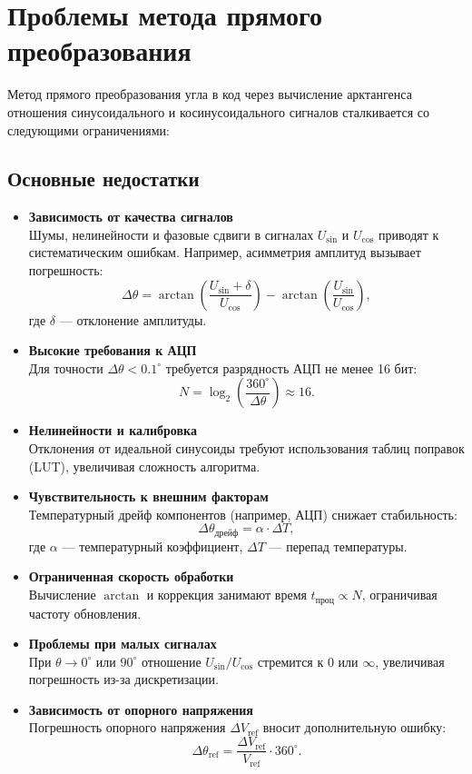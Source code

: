 \section{Проблемы метода прямого преобразования}
Метод прямого преобразования угла в код через вычисление арктангенса отношения синусоидального и косинусоидального сигналов сталкивается со следующими ограничениями:

\subsection{Основные недостатки}
\begin{itemize}
    \item \textbf{Зависимость от качества сигналов} \\
    Шумы, нелинейности и фазовые сдвиги в сигналах \( U_{\sin} \) и \( U_{\cos} \) приводят к систематическим ошибкам. Например, асимметрия амплитуд вызывает погрешность:
    \[
    \Delta\theta = \arctan\left(\frac{U_{\sin} + \delta}{U_{\cos}}\right) - \arctan\left(\frac{U_{\sin}}{U_{\cos}}\right),
    \]
    где \(\delta\) — отклонение амплитуды.

    \item \textbf{Высокие требования к АЦП} \\
    Для точности \(\Delta\theta < 0.1^\circ\) требуется разрядность АЦП не менее 16 бит:
    \[
    N = \log_2\left(\frac{360^\circ}{\Delta\theta}\right) \approx 16.
    \]

    \item \textbf{Нелинейности и калибровка} \\
    Отклонения от идеальной синусоиды требуют использования таблиц поправок (LUT), увеличивая сложность алгоритма.

    \item \textbf{Чувствительность к внешним факторам} \\
    Температурный дрейф компонентов (например, АЦП) снижает стабильность:
    \[
    \Delta\theta_{\text{дрейф}} = \alpha \cdot \Delta T,
    \]
    где \(\alpha\) — температурный коэффициент, \(\Delta T\) — перепад температуры.

    \item \textbf{Ограниченная скорость обработки} \\
    Вычисление \(\arctan\) и коррекция занимают время \( t_{\text{проц}} \propto N \), ограничивая частоту обновления.

    \item \textbf{Проблемы при малых сигналах} \\
    При \(\theta \to 0^\circ\) или \(90^\circ\) отношение \( U_{\sin}/U_{\cos} \) стремится к \(0\) или \(\infty\), увеличивая погрешность из-за дискретизации.

    \item \textbf{Зависимость от опорного напряжения} \\
    Погрешность опорного напряжения \(\Delta V_{\text{ref}}\) вносит дополнительную ошибку:
    \[
    \Delta\theta_{\text{ref}} = \frac{\Delta V_{\text{ref}}}{V_{\text{ref}}} \cdot 360^\circ.
    \]
\end{itemize}


